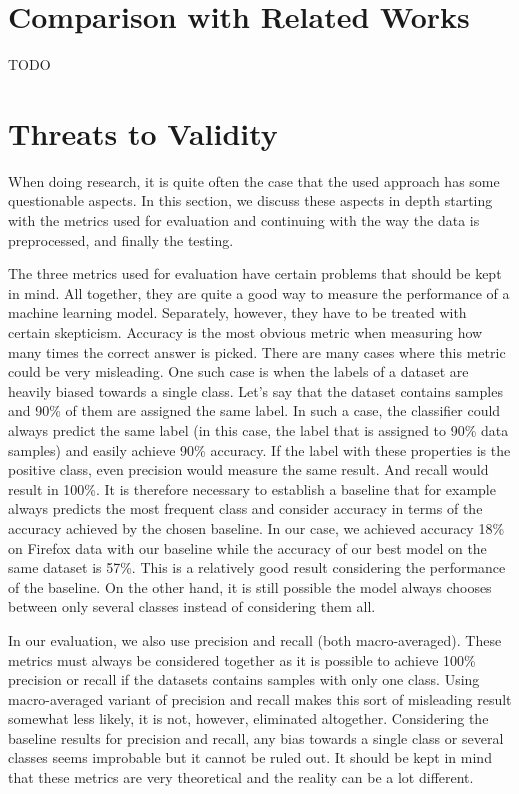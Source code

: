 \section{Comparison with Related Works}

TODO

\section{Threats to Validity}

When doing research, it is quite often the case that the used approach has some questionable aspects. In this section, we discuss these aspects in depth starting with the metrics used for evaluation and continuing with the way the data is preprocessed, and finally the testing.

The three metrics used for evaluation have certain problems that should be kept in mind. All together, they are quite a good way to measure the performance of a machine learning model. Separately, however, they have to be treated with certain skepticism. Accuracy is the most obvious metric when measuring how many times the correct answer is picked. There are many cases where this metric could be very misleading. One such case is when the labels of a dataset are heavily biased towards a single class. Let's say that the dataset contains samples and 90\% of them are assigned the same label. In such a case, the classifier could always predict the same label (in this case, the label that is assigned to 90\% data samples) and easily achieve 90\% accuracy. If the label with these properties is the positive class, even precision would measure the same result. And recall would result in 100\%. It is therefore necessary to establish a baseline that for example always predicts the most frequent class and consider accuracy in terms of the accuracy achieved by the chosen baseline. In our case, we achieved accuracy 18\% on Firefox data with our baseline while the accuracy of our best model on the same dataset is 57\%. This is a relatively good result considering the performance of the baseline. On the other hand, it is still possible the model always chooses between only several classes instead of considering them all. 

In our evaluation, we also use precision and recall (both macro-averaged). These metrics must always be considered together as it is possible to achieve 100\% precision or recall if the datasets contains samples with only one class. Using macro-averaged variant of precision and recall makes this sort of misleading result somewhat less likely, it is not, however, eliminated altogether. Considering the baseline results for precision and recall, any bias towards a single class or several classes seems improbable but it cannot be ruled out. It should be kept in mind that these metrics are very theoretical and the reality can be a lot different.

